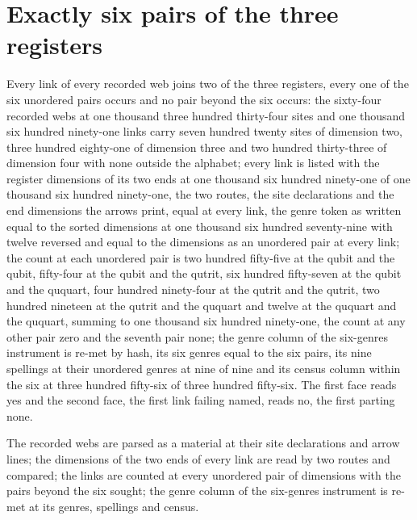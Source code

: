\section{Exactly six pairs of the three registers}\label{mod:IV-8d-D542437-sxpr-t1}
\begin{chtheorem}
Every link of every recorded web joins two of the three registers, every one of the six unordered pairs occurs and no pair beyond the six occurs: the sixty-four recorded webs at one thousand three hundred thirty-four sites and one thousand six hundred ninety-one links carry seven hundred twenty sites of dimension two, three hundred eighty-one of dimension three and two hundred thirty-three of dimension four with none outside the alphabet; every link is listed with the register dimensions of its two ends at one thousand six hundred ninety-one of one thousand six hundred ninety-one, the two routes, the site declarations and the end dimensions the arrows print, equal at every link, the genre token as written equal to the sorted dimensions at one thousand six hundred seventy-nine with twelve reversed and equal to the dimensions as an unordered pair at every link; the count at each unordered pair is two hundred fifty-five at the qubit and the qubit, fifty-four at the qubit and the qutrit, six hundred fifty-seven at the qubit and the ququart, four hundred ninety-four at the qutrit and the qutrit, two hundred nineteen at the qutrit and the ququart and twelve at the ququart and the ququart, summing to one thousand six hundred ninety-one, the count at any other pair zero and the seventh pair none; the genre column of the six-genres instrument is re-met by hash, its six genres equal to the six pairs, its nine spellings at their unordered genres at nine of nine and its census column within the six at three hundred fifty-six of three hundred fifty-six. The first face reads yes and the second face, the first link failing named, reads no, the first parting none.
\end{chtheorem}
\chdeps{}{}
The recorded webs are parsed as a material at their site declarations and arrow lines; the dimensions of the two ends of every link are read by two routes and compared; the links are counted at every unordered pair of dimensions with the pairs beyond the six sought; the genre column of the six-genres instrument is re-met at its genres, spellings and census.


